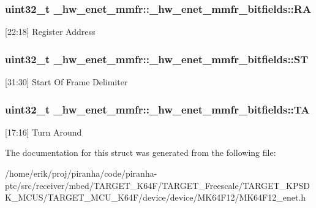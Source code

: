 \subsubsection[{\texorpdfstring{RA}{RA}}]{\setlength{\rightskip}{0pt plus 5cm}uint32\+\_\+t \+\_\+hw\+\_\+enet\+\_\+mmfr\+::\+\_\+hw\+\_\+enet\+\_\+mmfr\+\_\+bitfields\+::\+RA}\hypertarget{struct__hw__enet__mmfr_1_1__hw__enet__mmfr__bitfields_af6547b0e353f71bd2d26b4122329a3b6}{}\label{struct__hw__enet__mmfr_1_1__hw__enet__mmfr__bitfields_af6547b0e353f71bd2d26b4122329a3b6}
\mbox{[}22\+:18\mbox{]} Register Address 
\subsubsection[{\texorpdfstring{ST}{ST}}]{\setlength{\rightskip}{0pt plus 5cm}uint32\+\_\+t \+\_\+hw\+\_\+enet\+\_\+mmfr\+::\+\_\+hw\+\_\+enet\+\_\+mmfr\+\_\+bitfields\+::\+ST}\hypertarget{struct__hw__enet__mmfr_1_1__hw__enet__mmfr__bitfields_a36c4a2c8e589d052da2de291c1040ab1}{}\label{struct__hw__enet__mmfr_1_1__hw__enet__mmfr__bitfields_a36c4a2c8e589d052da2de291c1040ab1}
\mbox{[}31\+:30\mbox{]} Start Of Frame Delimiter 
\subsubsection[{\texorpdfstring{TA}{TA}}]{\setlength{\rightskip}{0pt plus 5cm}uint32\+\_\+t \+\_\+hw\+\_\+enet\+\_\+mmfr\+::\+\_\+hw\+\_\+enet\+\_\+mmfr\+\_\+bitfields\+::\+TA}\hypertarget{struct__hw__enet__mmfr_1_1__hw__enet__mmfr__bitfields_a3b781a89abebc5c7488a5575de011fbb}{}\label{struct__hw__enet__mmfr_1_1__hw__enet__mmfr__bitfields_a3b781a89abebc5c7488a5575de011fbb}
\mbox{[}17\+:16\mbox{]} Turn Around 

The documentation for this struct was generated from the following file\+:\begin{DoxyCompactItemize}
\item 
/home/erik/proj/piranha/code/piranha-\/ptc/src/receiver/mbed/\+T\+A\+R\+G\+E\+T\+\_\+\+K64\+F/\+T\+A\+R\+G\+E\+T\+\_\+\+Freescale/\+T\+A\+R\+G\+E\+T\+\_\+\+K\+P\+S\+D\+K\+\_\+\+M\+C\+U\+S/\+T\+A\+R\+G\+E\+T\+\_\+\+M\+C\+U\+\_\+\+K64\+F/device/device/\+M\+K64\+F12/M\+K64\+F12\+\_\+enet.\+h\end{DoxyCompactItemize}
